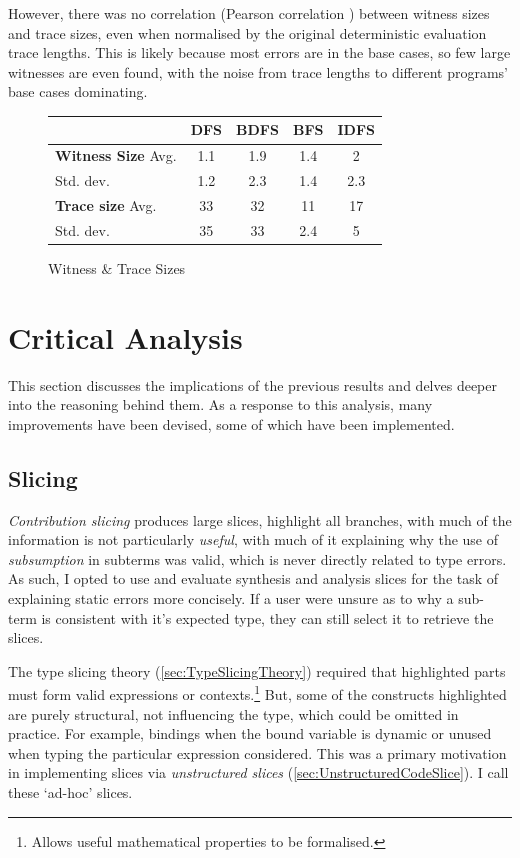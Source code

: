 However, there was no correlation (Pearson correlation \cite{PearsonCorrelation}) between witness sizes and trace sizes, even when normalised by the original deterministic evaluation trace lengths. This is likely because most errors are in the base cases, so few large witnesses are even found, with the noise from trace lengths to different programs' base cases dominating. 

\begin{figure}[h]\centering
\begin{tabular}{l|cccc}
& DFS & BDFS & BFS & IDFS\\
\hline
\textbf{Witness Size} Avg. & 1.1& 1.9&1.4&  2\\
Std. dev. & 1.2& 2.3&1.4&  2.3\\
\textbf{Trace size} Avg. & 33& 32& 11& 17\\
Std. dev. & 35& 33&2.4& 5
\end{tabular}
\caption{Witness \& Trace Sizes}
\label{fig:WitnessSize}
\end{figure}


\section{Critical Analysis}\label{sec:CriticalAnalysis}
This section discusses the implications of the previous results and delves deeper into the reasoning behind them. As a response to this analysis, many improvements have been devised, some of which have been implemented.
\subsection{Slicing}\label{sec:SlicingAnalysis}
\textit{Contribution slicing} produces large slices, highlight all branches, with much of the information is not particularly \textit{useful}, with much of it explaining why the use of \textit{subsumption} in subterms was valid, which is never directly related to type errors. As such,  I opted to use and evaluate synthesis and analysis slices for the task of explaining static errors more concisely. If a user were unsure as to why a sub-term is consistent with it's expected type, they can still select it to retrieve the slices.

The type slicing theory (\cref{sec:TypeSlicingTheory}) required that highlighted parts must form valid expressions or contexts.\footnote{Allows useful mathematical properties to be formalised.} But, some of the constructs highlighted are purely structural, not influencing the type, which could be omitted in practice. For example, bindings when the bound variable is dynamic or unused when typing the particular expression considered. This was a primary motivation in implementing slices via \textit{unstructured slices} (\cref{sec:UnstructuredCodeSlice}). I call these `ad-hoc' slices.

